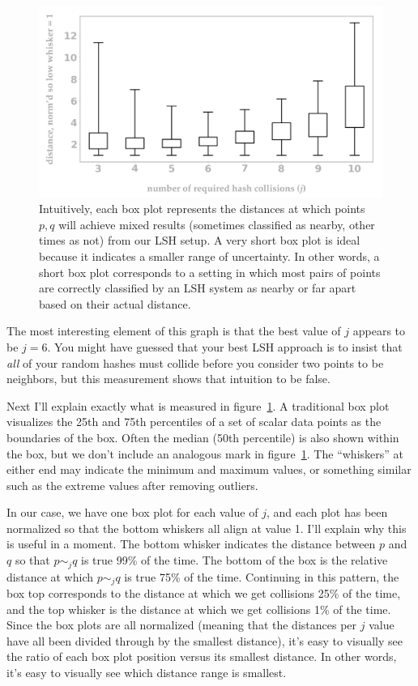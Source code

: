 \documentclass[20pt,]{extarticle}
\begin{document}
\begin{figure}
\centering
\includegraphics{images/image9@2x.png}
\caption{Intuitively, each box plot represents the distances at which
points \(p, q\) will achieve mixed results (sometimes classified as
nearby, other times as not) from our LSH setup. A very short box plot is
ideal because it indicates a smaller range of uncertainty. In other
words, a short box plot corresponds to a setting in which most pairs of
points are correctly classified by an LSH system as nearby or far apart
based on their actual distance.}\label{fig:fig9}
\end{figure}

The most interesting element of this graph is that the best value of
\(j\) appears to be \(j=6.\) You might have guessed that your best LSH
approach is to insist that \emph{all} of your random hashes must collide
before you consider two points to be neighbors, but this measurement
shows that intuition to be false.

Next I'll explain exactly what is measured in figure~\ref{fig:fig9}. A
traditional box plot visualizes the 25th and 75th percentiles of a set
of scalar data points as the boundaries of the box. Often the median
(50th percentile) is also shown within the box, but we don't include an
analogous mark in figure~\ref{fig:fig9}. The ``whiskers'' at either end
may indicate the minimum and maximum values, or something similar such
as the extreme values after removing outliers.

In our case, we have one box plot for each value of \(j\), and each plot
has been normalized so that the bottom whiskers all align at value 1.
I'll explain why this is useful in a moment. The bottom whisker
indicates the distance between \(p\) and \(q\) so that \(p\sim_j q\) is
true 99\% of the time. The bottom of the box is the relative distance at
which \(p\sim_j q\) is true 75\% of the time. Continuing in this
pattern, the box top corresponds to the distance at which we get
collisions 25\% of the time, and the top whisker is the distance at
which we get collisions 1\% of the time. Since the box plots are all
normalized (meaning that the distances per \(j\) value have all been
divided through by the smallest distance), it's easy to visually see the
ratio of each box plot position versus its smallest distance. In other
words, it's easy to visually see which distance range is smallest.
\end{document}
